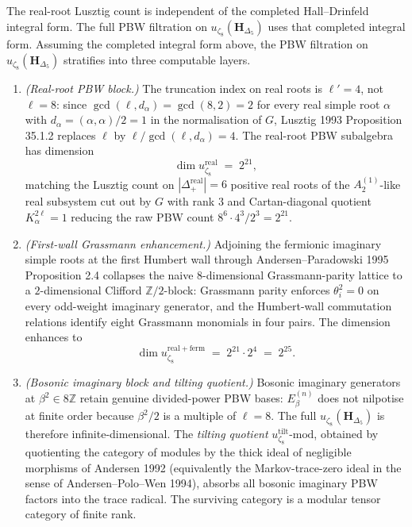 \begin{theorem}
\label{thm:pbw-trichotomy-zeta8}
The real-root Lusztig count is independent of the completed
Hall--Drinfeld integral form. The full PBW filtration on
\(u_{\zeta_8}(\mathbf H_{\Delta_5})\) uses that completed integral
form.
Assuming the completed integral form above, the PBW filtration on
$u_{\zeta_8}(\mathbf{H}_{\Delta_5})$ stratifies into three computable
layers.
\begin{enumerate}
\item \emph{(Real-root PBW block.)} The truncation index on real roots is $\ell' = 4$, not $\ell = 8$: since $\gcd(\ell,d_\alpha) = \gcd(8,2) = 2$ for every real simple root $\alpha$ with $d_\alpha = (\alpha,\alpha)/2 = 1$ in the normalisation of $G$, Lusztig 1993 Proposition 35.1.2 replaces $\ell$ by $\ell/\gcd(\ell,d_\alpha) = 4$. The real-root PBW subalgebra has dimension
\[
 \dim u_{\zeta_8}^{\mathrm{real}}
 \;=\;
 2^{21},
\]
matching the Lusztig count on $|\Delta^{\mathrm{real}}_+| = 6$ positive real roots of the $A_2^{(1)}$-like real subsystem cut out by $G$ with rank $3$ and Cartan-diagonal quotient $K_\alpha^{2\ell} = 1$ reducing the raw PBW count $8^6\cdot 4^3/2^3 = 2^{21}$.
\item \emph{(First-wall Grassmann enhancement.)} Adjoining the fermionic imaginary simple roots at the first Humbert wall through Andersen--Paradowski 1995 Proposition 2.4 collapses the naive $8$-dimensional Grassmann-parity lattice to a $2$-dimensional Clifford $\mathbb{Z}/2$-block: Grassmann parity enforces $\theta_i^2 = 0$ on every odd-weight imaginary generator, and the Humbert-wall commutation relations identify eight Grassmann monomials in four pairs. The dimension enhances to
\[
 \dim u_{\zeta_8}^{\mathrm{real+ferm}}
 \;=\;
 2^{21}\cdot 2^{4}
 \;=\;
 2^{25}.
\]
\item \emph{(Bosonic imaginary block and tilting quotient.)} Bosonic imaginary generators at $\beta^2\in 8\mathbb{Z}$ retain genuine divided-power PBW bases: $E_\beta^{(n)}$ does not nilpotise at finite order because $\beta^2/2$ is a multiple of $\ell = 8$. The full $u_{\zeta_8}(\mathbf{H}_{\Delta_5})$ is therefore infinite-dimensional. The \emph{tilting quotient} $u_{\zeta_8}^{\mathrm{tilt}}$-$\mathrm{mod}$, obtained by quotienting the category of modules by the thick ideal of negligible morphisms of Andersen 1992 (equivalently the Markov-trace-zero ideal in the sense of Andersen--Polo--Wen 1994), absorbs all bosonic imaginary PBW factors into the trace radical. The surviving category is a modular tensor category of finite rank.
\end{enumerate}
\end{theorem}


